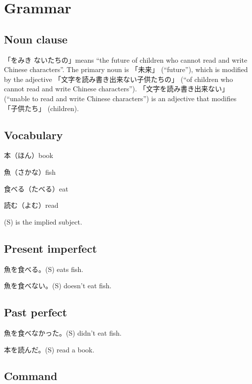 \chapter{Grammar}


\section{Noun clause}

「をみき%
ないたちの」means
``the future of children who cannot read and write Chinese characters''.
The primary noun is 「未来」 (``future''),
which is modified by the adjective
「文字を読み書き出来ない子供たちの」
(``of children who cannot read and write Chinese characters'').
「文字を読み書き出来ない」(``unable to read and write Chinese characters'')
is an adjective that modifies 「子供たち」 (children).

\section{Vocabulary}

本（ほん）book

魚（さかな）fish

食べる（たべる）eat

読む（よむ）read

(S) is the implied subject.

\section{Present imperfect}

魚を食べる。(S) eats fish.

魚を食べない。(S) doesn't eat fish.

\section{Past perfect}

魚を食べなかった。(S) didn't eat fish.

本を読んだ。(S) read a book.

\section{Command}

